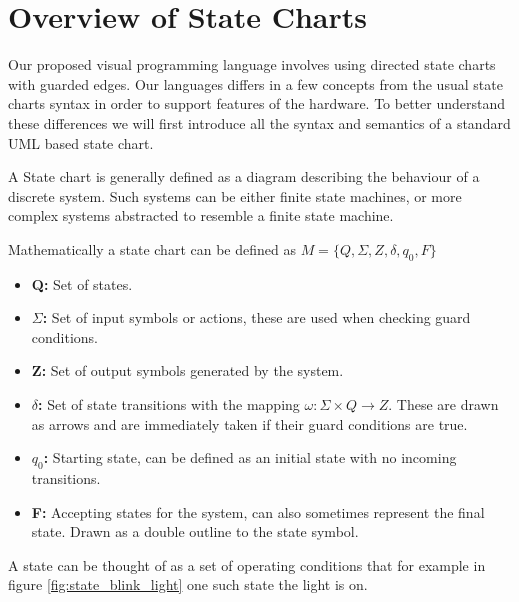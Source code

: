 \section{Overview of State Charts} \label{sec:overviewstatechart}

Our proposed visual programming language involves using directed state charts with guarded edges. Our languages differs in a few concepts from the usual state charts syntax in order to support features of the hardware. To better understand these differences we will first introduce all the syntax and semantics of a standard UML based state chart.

A State chart is generally defined as a diagram describing the behaviour of a discrete system. Such systems can be either finite state machines, or more complex systems abstracted to resemble a finite state machine. 

Mathematically a state chart can be defined as $M = \lbrace Q, \Sigma, Z, \delta, q_0, F \rbrace$

\begin{itemize}
	\item \textbf{Q:} Set of states.
	\item \textbf{$\Sigma$:} Set of input symbols or actions, these are used when checking guard conditions.
	\item \textbf{Z:} Set of output symbols generated by the system.
	\item \textbf{$\delta$:} Set of state transitions with the mapping $\omega: \Sigma \times Q \rightarrow Z$. These are drawn as arrows and are immediately taken if their guard conditions are true.
	\item \textbf{$q_0$:} Starting state, can be defined as an initial state with no incoming transitions.
	\item \textbf{F:} Accepting states for the system, can also sometimes represent the final state. Drawn as a double outline to the state symbol.
\end{itemize}

A state can be thought of as a set of operating conditions that for example in figure \ref{fig:state_blink_light}
one such state the light is on.

